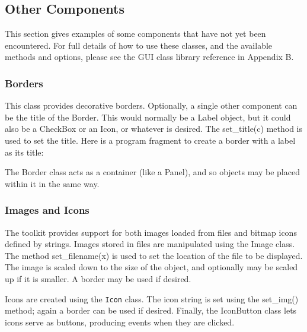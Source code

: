 \subsection{Other Components}

This section gives examples of some components that have not yet been
encountered. For full details of how to use these classes, and the
available methods and options, please see the GUI class library
reference in Appendix B.

\subsubsection[Borders]{Borders}
This class provides decorative borders. Optionally, a single other
component can be the title of the \textsf{Border}. This would normally
be a \textsf{Label} object, but it could also be a \textsf{CheckBox} or
an \textsf{Icon}, or whatever is desired. The \textsf{set\_title(c)}
method is used to set the title. Here is a program fragment to create a
border with a label as its title:


The \textsf{Border} class acts as a container (like a \textsf{Panel}),
and so objects may be placed within it in the same way.

\subsubsection{Images and Icons}

The toolkit provides support for both images loaded from files and
bitmap icons defined by strings. Images stored in files are manipulated
using the Image class. The method \textsf{set\_filename(x)} is used to
set the location of the file to be displayed. The image is scaled down
to the size of the object, and optionally may be scaled up if it is
smaller. A border may be used if desired.

Icons are created using the \texttt{Icon} class. The icon string is set
using the \textsf{set\_img()} method; again a border can be used if
desired. Finally, the \textsf{IconButton} class lets icons serve as
buttons, producing events when they are clicked.

